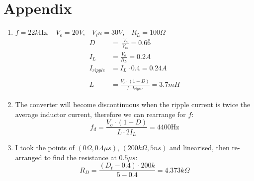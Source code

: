 \documentclass[a4paper,11pt]{article}
\begin{document}
\begin{preview}
\begin{enumerate}
\end{enumerate}

\section*{Appendix}

\begin{enumerate}
  \item $ f = 22k\mathrm{Hz}, \;\;\; V_o = 20V, \;\;\; V_in=30V, \;\;\; R_L=100\Omega $
  \begin{align*}
    D\ &=\ \frac{V_{o}}{V_{in}} = 0.6\bar{6}\\
    I_{L}&=\frac{V_{o}}{R_{L}} = 0.2A\\
    I_{ripple}&=I_{L}\cdot0.4 = 0.24A\\\\
    L&=\frac{V_{o}\cdot\left(1-D\right)}{f\cdot I_{ripple}} = 3.7mH
  \end{align*}

  \item The converter will become discontinuous when the ripple current is twice the average inductor current, therefore we can rearrange for $f$:
  $$ f_{d}=\frac{V_{o}\cdot\left(1-D\right)}{L\cdot2I_{L}} = 4400\mathrm{Hz}$$

  \item I took the points of $(0\Omega , 0.4\mu s)$, $(200k\Omega , 5ns)$ and linearised, then re-arranged to find the resistance at $0.5\mu s$:
  $$ R_{D}=\frac{\left(D_{t}-0.4\right)\cdot200k}{5-0.4} = 4.373k\Omega$$
\end{enumerate}


\end{preview}
\end{document}
